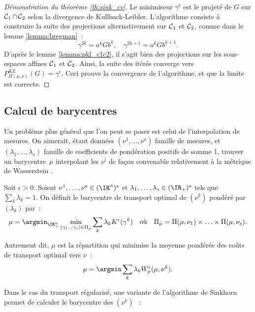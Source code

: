 \begin{proof}[Démonstration du théorème \ref{th:sink_cv}]
Le minimiseur $\gamma^\epsilon$ est le projeté de $G$ sur $\operatorname{\mathcal{C}}_1 \cap \operatorname{\mathcal{C}}_2$ selon la divergence de Kullback-Leibler. L'algorithme consiste à construire la suite des projections alternativement sur $\operatorname{\mathcal{C}}_1$ et $\operatorname{\mathcal{C}}_2$, comme dans le lemme \ref{lemma:bregman}~:
\[\gamma^{2k} = a^k G b^k,\quad \gamma^{2k+1} = a^k G b^{k+1} .\]
D'après le lemme \ref{lemma:pkl_c1c2}, il s'agit bien des projections sur les sous-espaces affines $\operatorname{\mathcal{C}}_1$ et $\operatorname{\mathcal{C}}_2$.
 Ainsi, la suite des itérés converge vers $P^{KL}_{\Pi(\mu,\nu)}(G) = \gamma^\epsilon$. Ceci prouve la convergence de l'algorithme, et que la limite est correcte.
\end{proof}

\subsection{Calcul de barycentres}
Un problème plus général que l'on peut se poser est celui de l'interpolation de mesures. On aimerait, étant données $(\nu^1, \ldots, \nu^s)$ famille de mesures, et $(\lambda_1, \ldots, \lambda_s)$ famille de coefficients de pondération positifs de somme 1, trouver un \og barycentre \fg $\,\mu$ interpolant les $\nu^i$ de façon convenable relativement à la métrique de Wasserstein \cite{agueh11}.

\begin{definition}
Soit $\epsilon > 0$. Soient $\nu^1, \ldots, \nu^s \in (\IR^{n})^s$ et $\lambda_1, \ldots, \lambda_s \in (\IR_+)^s$ tels que $\sum_k \lambda_k = 1$. On définit le barycentre de transport optimal de $(\nu^k)$ pondéré par $(\lambda_k)$ par~:
\[
\mu = \argmin_{\IR_{+}^{n}} \min_{(\gamma_1 \ldots \gamma_s) \in \Pi_\mu} \sum_k \lambda_k K^\epsilon(\gamma^k) 
\quad \text{où} \quad
\Pi_\mu = \Pi(\mu,\nu_1) \times \ldots \times \Pi(\mu,\nu_s) .
\]
\end{definition}
Autrement dit, $\mu$ est la répartition qui minimise la moyenne pondérée des coûts de transport optimal vers $\nu$~:
\[ \mu = \argmin \sum_k \lambda_k W^\epsilon_p(\mu,\nu^k) . \]

Dans le cas du transport régularisé, une variante de l'algorithme de Sinkhorn permet de calculer le barycentre des $(\nu^k)$ \cite{benamou15}~:

